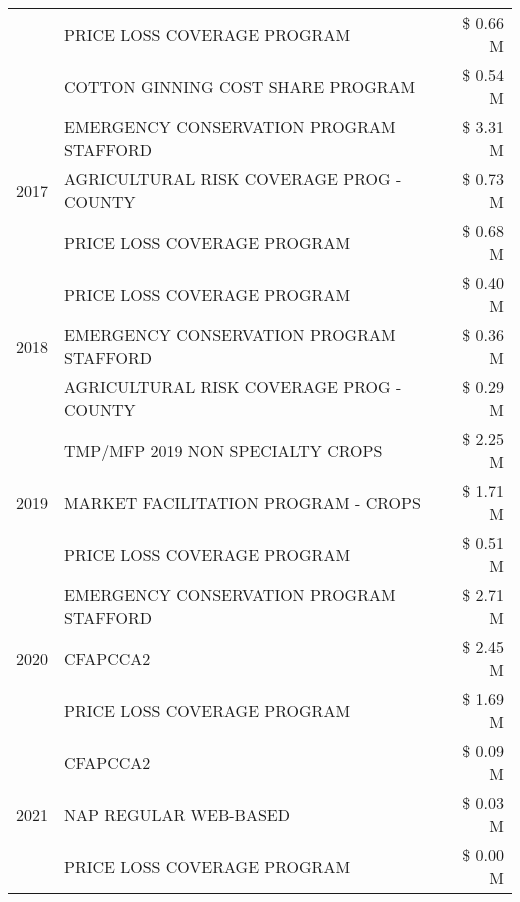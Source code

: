 \begin{tabular}{llr}
 & PRICE LOSS COVERAGE PROGRAM & \$ 0.66 M \\
 & COTTON GINNING COST SHARE PROGRAM & \$ 0.54 M \\
\cline{1-3}
\multirow[t]{3}{*}{2017} & EMERGENCY CONSERVATION PROGRAM STAFFORD & \$ 3.31 M \\
 & AGRICULTURAL RISK COVERAGE PROG - COUNTY & \$ 0.73 M \\
 & PRICE LOSS COVERAGE PROGRAM & \$ 0.68 M \\
\cline{1-3}
\multirow[t]{3}{*}{2018} & PRICE LOSS COVERAGE PROGRAM & \$ 0.40 M \\
 & EMERGENCY CONSERVATION PROGRAM STAFFORD & \$ 0.36 M \\
 & AGRICULTURAL RISK COVERAGE PROG - COUNTY & \$ 0.29 M \\
\cline{1-3}
\multirow[t]{3}{*}{2019} & TMP/MFP 2019 NON SPECIALTY CROPS & \$ 2.25 M \\
 & MARKET FACILITATION PROGRAM - CROPS & \$ 1.71 M \\
 & PRICE LOSS COVERAGE PROGRAM & \$ 0.51 M \\
\cline{1-3}
\multirow[t]{3}{*}{2020} & EMERGENCY CONSERVATION PROGRAM STAFFORD & \$ 2.71 M \\
 & CFAPCCA2 & \$ 2.45 M \\
 & PRICE LOSS COVERAGE PROGRAM & \$ 1.69 M \\
\cline{1-3}
\multirow[t]{3}{*}{2021} & CFAPCCA2 & \$ 0.09 M \\
 & NAP REGULAR WEB-BASED & \$ 0.03 M \\
 & PRICE LOSS COVERAGE PROGRAM & \$ 0.00 M \\
\cline{1-3}
\bottomrule
\end{tabular}
